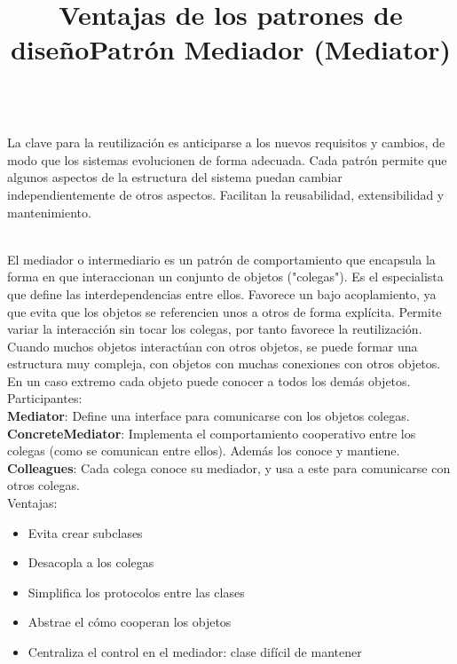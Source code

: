 \documentclass[a4paper,10pt]{report}
\begin{document}
\title{\textbf{Ventajas de los patrones de diseño}}\\

La clave para la reutilización es anticiparse a los nuevos requisitos y cambios, de modo que los sistemas evolucionen de forma adecuada. Cada patrón permite que algunos aspectos de la estructura del sistema puedan cambiar independientemente de otros aspectos. Facilitan la reusabilidad, extensibilidad y mantenimiento.\\\\


\title{\textbf{Patrón Mediador (Mediator)\\}}

El mediador o intermediario es un patrón de comportamiento que encapsula la forma en que interaccionan un conjunto de objetos ("colegas"). Es el especialista que define las interdependencias entre ellos. Favorece un bajo acoplamiento, ya que evita que los objetos se referencien unos a otros de forma explícita. Permite variar la interacción sin tocar los colegas, por tanto favorece la reutilización.\\

Cuando muchos objetos interactúan con otros objetos, se puede formar una estructura muy compleja, con objetos con muchas conexiones con otros objetos. En un caso extremo cada objeto puede conocer a todos los demás objetos.\\


Participantes:\\


\textbf{Mediator}: Define una interface para comunicarse con los objetos colegas.\\

\textbf{ConcreteMediator}: Implementa el comportamiento cooperativo entre los colegas (como se comunican entre ellos). Además los conoce y mantiene.\\

\textbf{Colleagues}: Cada colega conoce su mediador, y usa a este para comunicarse con otros colegas.\\

Ventajas:
\begin{itemize}
\item{Evita crear subclases}
\item{Desacopla a los colegas} 
\item{Simplifica los protocolos entre las clases}
\item{Abstrae el cómo cooperan los objetos}
\item{Centraliza el control en el mediador: clase difícil de mantener\\}
\end{itemize}
\end{document}
